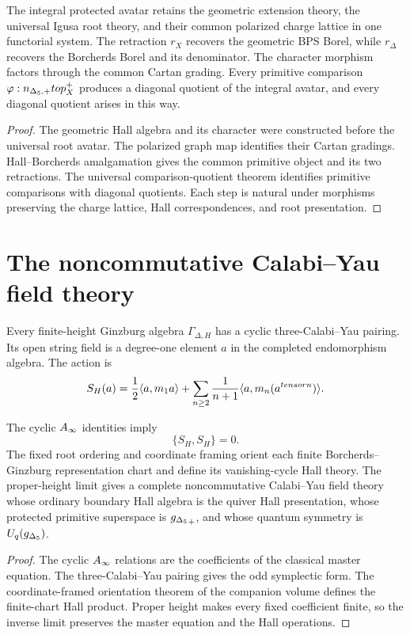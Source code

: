 \begin{theorem}
The integral protected avatar retains the geometric extension theory, the universal Igusa root theory, and their common polarized charge lattice in one functorial system.  The retraction $r_X$ recovers the geometric BPS Borel, while $r_\Delta$ recovers the Borcherds Borel and its denominator.  The character morphism factors through the common Cartan grading.  Every primitive comparison $\varphi:{n_{\Delta_5,+}}top_X^+$ produces a diagonal quotient of the integral avatar, and every diagonal quotient arises in this way.
\end{theorem}
\begin{proof}
The geometric Hall algebra and its character were constructed before the universal root avatar.  The polarized graph map identifies their Cartan gradings.  Hall--Borcherds amalgamation gives the common primitive object and its two retractions.  The universal comparison-quotient theorem identifies primitive comparisons with diagonal quotients.  Each step is natural under morphisms preserving the charge lattice, Hall correspondences, and root presentation.
\end{proof}

\chapter{The noncommutative Calabi--Yau field theory}
Every finite-height Ginzburg algebra $\Gamma_{\Delta,H}$ has a cyclic three-Calabi--Yau pairing.  Its open string field is a degree-one element $a$ in the completed endomorphism algebra.  The action is
\[
 S_H(a)=
 \frac12\langle a,m_1a\rangle
 +\sum_{n\ge2}\frac1{n+1}\langle a,m_n(a^{tensor n})\rangle.
\]

\begin{theorem}
The cyclic $A_\infty$ identities imply
\[
 \{S_H,S_H\}=0.
\]
The fixed root ordering and coordinate framing orient each finite Borcherds--Ginzburg representation chart and define its vanishing-cycle Hall theory.  The proper-height limit gives a complete noncommutative Calabi--Yau field theory whose ordinary boundary Hall algebra is the quiver Hall presentation, whose protected primitive superspace is ${g_{\Delta_5}}_+$, and whose quantum symmetry is $U_q({g_{\Delta_5}})$.
\end{theorem}
\begin{proof}
The cyclic $A_\infty$ relations are the coefficients of the classical master equation.  The three-Calabi--Yau pairing gives the odd symplectic form.  The coordinate-framed orientation theorem of the companion volume defines the finite-chart Hall product.  Proper height makes every fixed coefficient finite, so the inverse limit preserves the master equation and the Hall operations.
\end{proof}

